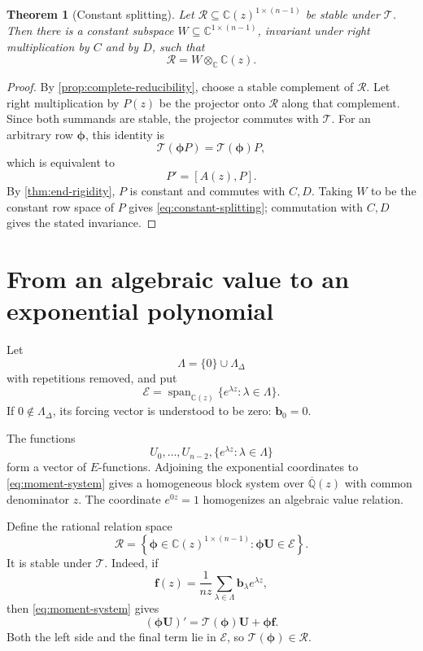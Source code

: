 \documentclass[11pt]{article}
\numberwithin{equation}{section}
\newtheorem{theorem}{Theorem}[section]
\theoremstyle{definition}
\theoremstyle{remark}
\newcommand{\C}{\mathbb C}
\newcommand{\Qbar}{\overline{\mathbb Q}}
\newcommand{\Span}{\operatorname{span}}
\newcommand{\Ecal}{\mathcal E}
\newcommand{\Rcal}{\mathcal R}
\begin{document}
\begin{theorem}[Constant splitting]\label{thm:constant-splitting}
Let $\Rcal\subseteq\C(z)^{1\times(n-1)}$ be stable under $\mathcal T$.  Then
there is a constant subspace $W\subseteq\C^{1\times(n-1)}$, invariant under
right multiplication by $C$ and by $D$, such that
\begin{equation}\label{eq:constant-splitting}
  \Rcal=W\otimes_\C\C(z).
\end{equation}
\end{theorem}

\begin{proof}
By \cref{prop:complete-reducibility}, choose a stable complement of $\Rcal$.
Let right multiplication by $P(z)$ be the projector onto $\Rcal$ along that
complement.  Since both summands are stable, the projector commutes with
$\mathcal T$.  For an arbitrary row $\boldsymbol\phi$, this identity is
\[
  \mathcal T(\boldsymbol\phi P)=\mathcal T(\boldsymbol\phi)P,
\]
which is equivalent to
\[
  P'=[A(z),P].
\]
By \cref{thm:end-rigidity}, $P$ is constant and commutes with $C,D$.  Taking
$W$ to be the constant row space of $P$ gives
\eqref{eq:constant-splitting}; commutation with $C,D$ gives the stated
invariance.
\end{proof}

\section{From an algebraic value to an exponential polynomial}
\label{sec:value-to-exponential}

Let
\begin{equation}\label{eq:Lambda-all}
  \Lambda=\{0\}\cup\Lambda_\Delta
\end{equation}
with repetitions removed, and put
\begin{equation}\label{eq:E-space}
  \Ecal=
  \Span_{\C(z)}\{e^{\lambda z}:\lambda\in\Lambda\}.
\end{equation}
If $0\notin\Lambda_\Delta$, its forcing vector is understood to be zero:
$\mathbf b_0=0$.

The functions
\[
  U_0,\ldots,U_{n-2},
  \{e^{\lambda z}:\lambda\in\Lambda\}
\]
form a vector of $E$-functions.  Adjoining the exponential coordinates to
\eqref{eq:moment-system} gives a homogeneous block system over $\Qbar(z)$
with common denominator $z$.  The coordinate $e^{0z}=1$ homogenizes an
algebraic value relation.

Define the rational relation space
\begin{equation}\label{eq:relation-space}
  \Rcal=
  \left\{
    \boldsymbol\phi\in\C(z)^{1\times(n-1)}:
    \boldsymbol\phi\mathbf U\in\Ecal
  \right\}.
\end{equation}
It is stable under $\mathcal T$.  Indeed, if
\[
  \mathbf f(z)=\frac1{nz}
  \sum_{\lambda\in\Lambda}\mathbf b_\lambda e^{\lambda z},
\]
then \eqref{eq:moment-system} gives
\[
  (\boldsymbol\phi\mathbf U)'
  =\mathcal T(\boldsymbol\phi)\mathbf U
   +\boldsymbol\phi\mathbf f.
\]
Both the left side and the final term lie in $\Ecal$, so
$\mathcal T(\boldsymbol\phi)\in\Rcal$.
\end{document}
